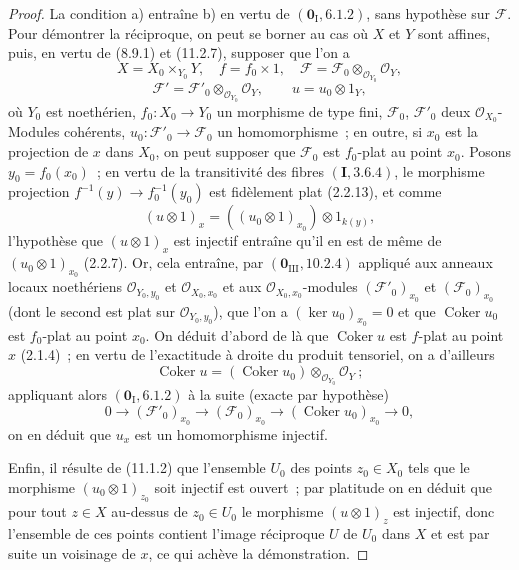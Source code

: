 \begin{proof}
La condition a) entraîne b) en vertu de $(\mathbf 0_{\mathrm I},6.1.2)$, sans
hypothèse sur $\mathcal F$. Pour démontrer la réciproque, on peut se borner au
cas où $X$ et $Y$ sont affines, puis, en vertu de (8.9.1) et (11.2.7), supposer
que l'on a
\[
X=X_0\times_{Y_0}Y,\quad f=f_0\times1,\quad
\mathcal F=\mathcal F_0\otimes_{\mathcal O_{Y_0}}\mathcal O_Y,
\]
\[
\mathcal F'=\mathcal F'_0\otimes_{\mathcal O_{Y_0}}\mathcal O_Y,
\qquad u=u_0\otimes1_Y,
\]
où $Y_0$ est noethérien, $f_0:X_0\to Y_0$ un morphisme de type fini,
$\mathcal F_0$, $\mathcal F'_0$ deux $\mathcal O_{X_0}$-Modules cohérents,
$u_0:\mathcal F'_0\to\mathcal F_0$ un homomorphisme~; en outre, si $x_0$ est la
projection de $x$ dans $X_0$, on peut supposer que $\mathcal F_0$ est
$f_0$-plat au point $x_0$. Posons $y_0=f_0(x_0)$~; en vertu de la transitivité
des fibres $(\mathbf I,3.6.4)$, le morphisme projection
$f^{-1}(y)\to f_0^{-1}(y_0)$ est fidèlement plat (2.2.13), et comme
\[
(u\otimes1)_x=((u_0\otimes1)_{x_0})\otimes1_{k(y)},
\]
l'hypothèse que $(u\otimes1)_x$ est injectif entraîne qu'il en est de même de
$(u_0\otimes1)_{x_0}$ (2.2.7). Or, cela entraîne, par
$(\mathbf 0_{\mathrm{III}},10.2.4)$ appliqué aux anneaux locaux noethériens
$\mathcal O_{Y_0,y_0}$ et $\mathcal O_{X_0,x_0}$ et aux
$\mathcal O_{X_0,x_0}$-modules $(\mathcal F'_0)_{x_0}$ et
$(\mathcal F_0)_{x_0}$ (dont le second est plat sur $\mathcal O_{Y_0,y_0}$),
que l'on a $(\ker u_0)_{x_0}=0$ et que $\operatorname{Coker}u_0$ est
$f_0$-plat au point $x_0$. On déduit d'abord de là que
$\operatorname{Coker}u$ est $f$-plat au point $x$ (2.1.4)~; en vertu de
l'exactitude à droite du produit tensoriel, on a d'ailleurs
\[
\operatorname{Coker}u=(\operatorname{Coker}u_0)
 \otimes_{\mathcal O_{Y_0}}\mathcal O_Y~;
\]
appliquant alors $(\mathbf 0_{\mathrm I},6.1.2)$ à la suite (exacte par
hypothèse)
\[
0\longrightarrow(\mathcal F'_0)_{x_0}\longrightarrow
(\mathcal F_0)_{x_0}\longrightarrow(\operatorname{Coker}u_0)_{x_0}
\longrightarrow0,
\]
on en déduit que $u_x$ est un homomorphisme injectif.

Enfin, il résulte de (11.1.2) que l'ensemble $U_0$ des points $z_0\in X_0$ tels
que le morphisme $(u_0\otimes1)_{z_0}$ soit injectif est ouvert~; par platitude
on en déduit que pour tout $z\in X$ au-dessus de $z_0\in U_0$ le morphisme
$(u\otimes1)_z$ est injectif, donc l'ensemble de ces points contient l'image
réciproque $U$ de $U_0$ dans $X$ et est par suite un voisinage de $x$, ce qui
achève la démonstration.
\end{proof}


